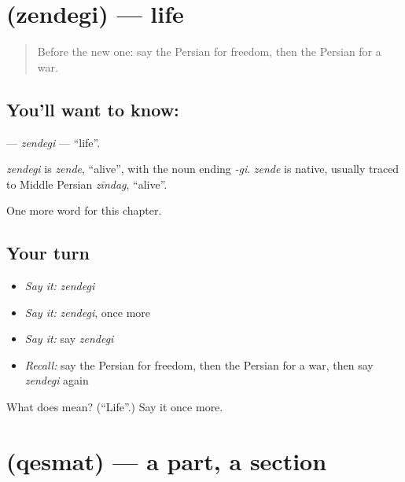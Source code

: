 \section[\texorpdfstring{\fa{زندگی} (zendegi)}{زندگی (zendegi)}]{ (zendegi) — life}

\label{lesson:FA-C234-zendegi}



\begin{quote}
Before the new one: say the Persian for freedom, then the Persian for a war.
\end{quote}

\subsection*{You'll want to know: }
\textbf{} — \emph{zendegi} — \textquotedblleft{}life\textquotedblright{}.

\begin{cousinweb}
\emph{zendegi} is \emph{zende}, \textquotedblleft{}alive\textquotedblright{}, with the noun ending \emph{-gi}. \emph{zende} is native, usually traced to Middle Persian \emph{zīndag}, \textquotedblleft{}alive\textquotedblright{}.
\end{cousinweb}

\begin{grammarlens}[title={What you've built}]
One more word for this chapter.
\end{grammarlens}

\subsection*{Your turn}
\begin{itemize}
\raggedright
  \item \emph{Say it:} \emph{zendegi}
  \item \emph{Say it:} \emph{zendegi}, once more
  \item \emph{Say it:} say \emph{zendegi}
  \item \emph{Recall:} say the Persian for freedom, then the Persian for a war, then say \emph{zendegi} again
\end{itemize}

\begin{tcolorbox}[breakable,colback=teal!4,colframe=teal!35!black,title={Before you move on}]
What does  mean? (\textquotedblleft{}Life\textquotedblright{}.) Say it once more.
\end{tcolorbox}
\section[\texorpdfstring{\fa{قسمت} (qesmat)}{قسمت (qesmat)}]{ (qesmat) — a part, a section}

